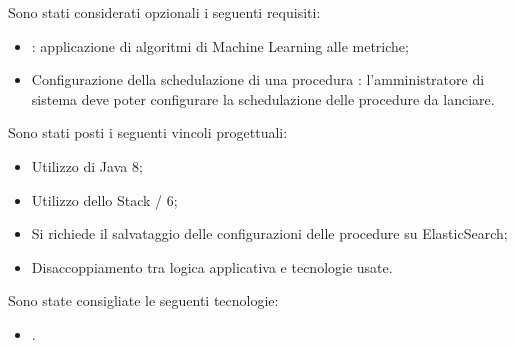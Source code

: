 Sono stati considerati opzionali i seguenti requisiti:
\begin{itemize}
\item {}: applicazione di algoritmi di Machine Learning alle metriche;
\item Configurazione della schedulazione di una procedura : l'amministratore di sistema deve
poter configurare la schedulazione delle procedure da lanciare.
\end{itemize}

\newpage

Sono stati posti i seguenti vincoli progettuali:
\begin{itemize}
\item Utilizzo di Java 8;
\item Utilizzo dello Stack / 6;
\item Si richiede il salvataggio delle configurazioni delle procedure su ElasticSearch;
\item Disaccoppiamento tra logica applicativa e tecnologie usate.
\end{itemize}

Sono state consigliate le seguenti tecnologie:
\begin{itemize}
\item {}.
\end{itemize}

